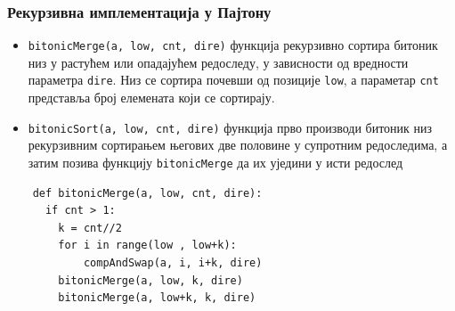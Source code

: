 \begin{frame}[fragile]
\frametitle{Рекурзивна имплементација у Пајтону}
 \begin{itemize}
  \item \verb+bitonicMerge(a, low, cnt, dire)+ функција рекурзивно сортира битоник низ у растућем или опадајућем редоследу, у зависности од вредности параметра \verb+dire+. Низ се сортира почевши од позиције \verb+low+, а параметар \verb+cnt+ представља број елемената који се сортирају.
  \item \verb+bitonicSort(a, low, cnt, dire)+ функција прво производи битоник низ рекурзивним сортирањем његових две половине у супротним редоследима, а затим позива функцију \verb+bitonicMerge+ да их уједини у исти редослед
 \end{itemize}
  \begin{verbatim}
    def bitonicMerge(a, low, cnt, dire):
      if cnt > 1:
        k = cnt//2
        for i in range(low , low+k):
            compAndSwap(a, i, i+k, dire)
        bitonicMerge(a, low, k, dire)
        bitonicMerge(a, low+k, k, dire)
  \end{verbatim}

\end{frame}

